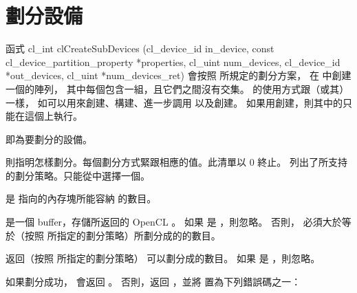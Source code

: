\section{劃分設備}
函式
\startclc[indentnext=no]
cl_int clCreateSubDevices (cl_device_id in_device,
			   const cl_device_partition_property *properties,
			   cl_uint num_devices,
			   cl_device_id *out_devices,
			   cl_uint *num_devices_ret)
\stopclc
會按照  所規定的劃分方案，
在  中創建一個的陣列，
其中每個包含一組，且它們之間沒有交集。
的使用方式跟（或其）一樣，
如可以用來創建、構建、進一步調用  以及創建。
如果用創建，則其中的只能在這個上執行。

 即為要劃分的設備。

 則指明怎樣劃分。每個劃分方式緊跟相應的值。此清單以 0 終止。
列出了所支持的劃分策略。只能從中選擇一個。

{}

 是  指向的內存塊所能容納  的數目。

 是一個 buffer，存儲所返回的 OpenCL 。
如果  是 ，則忽略。
否則，  必須大於等於（按照  所指定的劃分策略）所劃分成的的數目。

 返回（按照  所指定的劃分策略） 可以劃分成的數目。
如果  是 ，則忽略。

如果劃分成功，  會返回 。
否則，返回 ，並將  置為下列錯誤碼之一：

